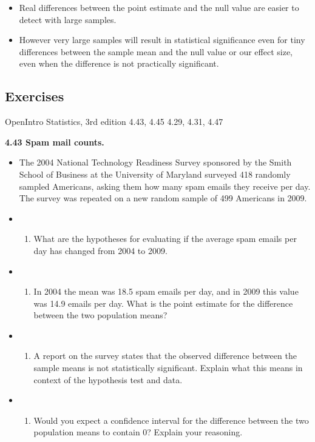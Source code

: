 \documentclass[]{book}
\providecommand{\tightlist}{%
  \setlength{\itemsep}{0pt}\setlength{\parskip}{0pt}}
\begin{document}
\begin{itemize}
\tightlist
\item
  Real differences between the point estimate and the null value are easier to detect with large samples.
\item
  However very large samples will result in statistical significance even for tiny differences between the sample mean and the null value or our effect size, even when the difference is not practically significant.
\end{itemize}

\hypertarget{exercises-3}{%
\subsection*{Exercises}\label{exercises-3}}

OpenIntro Statistics, 3rd edition
4.43, 4.45
4.29, 4.31, 4.47

\textbf{4.43 Spam mail counts.}

\begin{itemize}
\item
  The 2004 National Technology Readiness Survey sponsored by the
  Smith School of Business at the University of Maryland surveyed 418 randomly sampled Americans,
  asking them how many spam emails they receive per day. The survey was repeated on a new
  random sample of 499 Americans in 2009.
\item
  \begin{enumerate}
  \def\labelenumi{(\alph{enumi})}
  \tightlist
  \item
    What are the hypotheses for evaluating if the average spam emails per day has changed from
    2004 to 2009.
  \end{enumerate}
\item
  \begin{enumerate}
  \def\labelenumi{(\alph{enumi})}
  \setcounter{enumi}{1}
  \tightlist
  \item
    In 2004 the mean was 18.5 spam emails per day, and in 2009 this value was 14.9 emails per
    day. What is the point estimate for the difference between the two population means?
  \end{enumerate}
\item
  \begin{enumerate}
  \def\labelenumi{(\alph{enumi})}
  \setcounter{enumi}{2}
  \tightlist
  \item
    A report on the survey states that the observed difference between the sample means is not
    statistically significant. Explain what this means in context of the hypothesis test and data.
  \end{enumerate}
\item
  \begin{enumerate}
  \def\labelenumi{(\alph{enumi})}
  \setcounter{enumi}{3}
  \tightlist
  \item
    Would you expect a confidence interval for the difference between the two population means
    to contain 0? Explain your reasoning.
  \end{enumerate}
\end{itemize}
\end{document}

